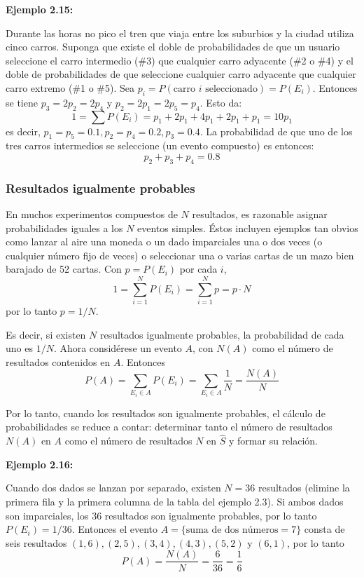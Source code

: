 \documentclass[a4paper]{article}
\begin{document}
\textbf{Ejemplo 2.15:}

Durante las horas no pico el tren que viaja entre los suburbios y la ciudad utiliza cinco carros. Suponga que existe el doble de probabilidades de que un usuario seleccione el carro intermedio (\#3) que cualquier carro adyacente (\#2 o \#4) y el doble de probabilidades de que seleccione cualquier carro adyacente que cualquier carro extremo (\#1 o \#5). Sea $p_i = P(\text{carro } i \text{ seleccionado}) = P(E_i)$. Entonces se tiene $p_3 = 2p_2 = 2p_4$ y $p_2 = 2p_1 = 2p_5 = p_4$. Esto da:
$$ 1 = \sum P(E_i) = p_1 + 2p_1 + 4p_1 + 2p_1 + p_1 = 10p_1 $$
es decir, $p_1 = p_5 = 0.1, p_2 = p_4 = 0.2, p_3 = 0.4$. La probabilidad de que uno de los tres carros intermedios se seleccione (un evento compuesto) es entonces:
$$ p_2 + p_3 + p_4 = 0.8 $$

\subsubsection{Resultados igualmente probables}

En muchos experimentos compuestos de $N$ resultados, es razonable asignar probabilidades iguales a los $N$ eventos simples. Éstos incluyen ejemplos tan obvios como lanzar al aire una moneda o un dado imparciales una o dos veces (o cualquier número fijo de veces) o seleccionar una o varias cartas de un mazo bien barajado de 52 cartas. Con $p = P(E_i)$ por cada $i$,
$$ 1 = \sum_{i=1}^{N} P(E_i) = \sum_{i=1}^{N} p = p \cdot N $$
por lo tanto $p = 1/N$.

Es decir, si existen $N$ resultados igualmente probables, la probabilidad de cada uno es $1/N$. Ahora considérese un evento $A$, con $N(A)$ como el número de resultados contenidos en $A$. Entonces
$$ P(A) = \sum_{E_i \in A} P(E_i) = \sum_{E_i \in A} \frac{1}{N} = \frac{N(A)}{N} $$

Por lo tanto, cuando los resultados son igualmente probables, el cálculo de probabilidades se reduce a contar: determinar tanto el número de resultados $N(A)$ en $A$ como el número de resultados $N$ en $\hat{S}$ y formar su relación.

\textbf{Ejemplo 2.16:}

Cuando dos dados se lanzan por separado, existen $N = 36$ resultados (elimine la primera fila y la primera columna de la tabla del ejemplo 2.3). Si ambos dados son imparciales, los 36 resultados son igualmente probables, por lo tanto $P(E_i) = 1/36$. Entonces el evento $A = \{\text{suma de dos números} = 7\}$ consta de seis resultados $(1, 6), (2, 5), (3, 4), (4, 3), (5, 2)$ y $(6, 1)$, por lo tanto
$$ P(A) = \frac{N(A)}{N} = \frac{6}{36} = \frac{1}{6} $$
\end{document}
